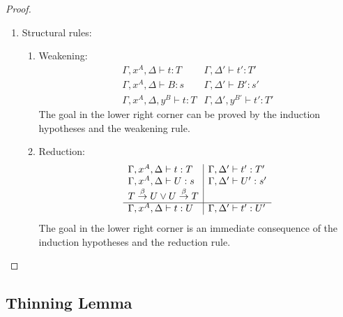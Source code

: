 \begin{theorem}
\begin{proof}
\begin{enumerate}
            \item Structural rules:
            \begin{enumerate}
                \item Weakening:
                $$
                \begin{array}{l|l}
                    \Gamma,x^A,\Delta \vdash t: T
                    &
                    \Gamma,\Delta' \vdash t' : T'
                    \\
                    \Gamma,x^A,\Delta \vdash B: s
                    &
                    \Gamma,\Delta' \vdash B' : s'
                    \\
                    \hline
                    \Gamma,x^A,\Delta,y^B \vdash t : T
                    &
                    \Gamma,\Delta',y^{B'} \vdash t' : T'
                \end{array}
                $$
                The goal in the lower right corner can be proved by the
                    induction hypotheses and the weakening rule.

                \item Reduction:
                $$
                \begin{array}{l|l}
                    \Gamma,x^A,\Delta \vdash t : T
                    &
                    \Gamma,\Delta' \vdash t' : T'
                    \\
                    \Gamma,x^A,\Delta \vdash U : s
                    &
                    \Gamma,\Delta' \vdash U' : s'
                    \\
                    T \stackrel{\beta}{\to} U \lor U \stackrel{\beta}{\to} T
                    \\
                    \hline
                    \Gamma,x^A,\Delta \vdash t : U
                    &
                    \Gamma,\Delta' \vdash t' : U'
                \end{array}
                $$
                The goal in the lower right corner is an immediate consequence
                of the induction hypotheses and the reduction rule.
            \end{enumerate}

        \end{enumerate}
    \end{proof}
\end{theorem}






\subsection{Thinning Lemma}

